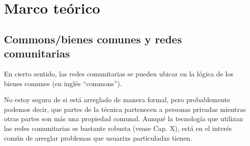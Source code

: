 \section{Marco teórico}

\subsection{Commons/bienes comunes y redes comunitarias}

En cierto sentido, las redes comunitarias se pueden ubicar en la lógica de los bienes comunes (en inglés ``commons'').

No estoy segura de si está arreglado de manera formal, pero probablemente podemos decir, que partes de la técnica partenecen a personas privadas mientras otras partes son más una propiedad comunal.
Aunqué la tecnología que utilizan las redes comunitarias es bastante robusta (vease Cap. X), está en el interés común de arreglar problemas que usuarixs particuladxs tienen.


